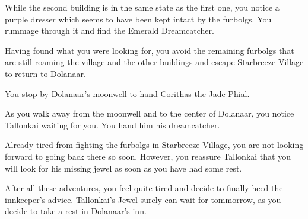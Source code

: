 While the second building is in the same state as the first one, you notice a purple dresser which seems to have been kept intact by the furbolgs. You rummage through it and find the Emerald Dreamcatcher.

Having found what you were looking for, you avoid the remaining furbolgs that are still roaming the village and the other buildings and escape Starbreeze Village to return to Dolanaar.

You stop by Dolanaar's moonwell to hand Corithas the Jade Phial.


As you walk away from the moonwell and to the center of Dolanaar, you notice Tallonkai waiting for you. You hand him his dreamcatcher.



Already tired from fighting the furbolgs in Starbreeze Village, you are not looking forward to going back there so soon. However, you reassure Tallonkai that you will look for his missing jewel as soon as you have had some rest.


After all these adventures, you feel quite tired and decide to finally heed the innkeeper's advice. Tallonkai's Jewel surely can wait for tommorrow, as you decide to take a rest in Dolanaar's inn.


